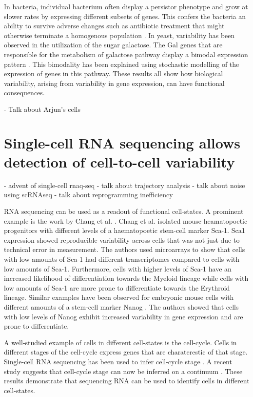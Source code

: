 In bacteria, individual bacterium often display a persistor phenotype and grow at slower rates by expressing different subsets of genes. This confers the bacteria an ability to survive adverse changes such as antibiotic treatment that might otherwise terminate a homogenous population \cite{veening_bet-hedging_2008}. In yeast, variability has been observed in the utilization of the sugar galactose. The Gal genes that are responsible for the metabolism of galactose pathway display a bimodal expression pattern \cite{acar_enhancement_2005}. This bimodality has been explained using stochastic modelling of the expression of genes in this pathway. These results all show how biological variability, arising from variability in gene expression, can have functional consequences. 


- Talk about Arjun's cells


\section{Single-cell RNA sequencing allows detection of cell-to-cell variability}

- advent of single-cell rnaq-seq
- talk about trajectory analysis
- talk about noise using scRNAseq
- talk about reprogramming inefficiency

RNA sequencing can be used as a readout of functional cell-states. A prominent example is the work by Chang et al.  \cite{chang_transcriptome-wide_2008}. Chang et al. isolated mouse heamatopoetic progenitors with different levels of a haematopoetic stem-cell marker Sca-1.  Sca1 expression showed reproducible variability across cells that was not just due to technical error in measurement. The authors used microarrays to show that cells with low amounts of Sca-1 had different transcriptomes compared to cells with low amounts of Sca-1. Furthermore, cells with higher levels of Sca-1 have an increased likelihood of differentiation towards the Myeloid lineage while cells with low amounts of Sca-1 are more prone to differentiate towards the Erythroid lineage. Similar examples have been observed for embryonic mouse cells with different amounts of a stem-cell marker Nanog \cite{kalmar_regulated_2009}. The authors showed that cells with low levels of Nanog exhibit increased variability in gene expression and are prone to differentiate.

A well-studied example of cells in different cell-states is the cell-cycle. Cells in different stages of the cell-cycle express genes that are charaterestic of that stage. Single-cell RNA sequencing has been used to infer cell-cycle stage \cite{buettner_computational_2015,leng_oscope_2015}. A recent study suggests that cell-cycle stage can now be inferred on a continuum  \cite{hsiao_characterizing_2019}. These results demonstrate that sequencing RNA can be used to identify cells in different cell-states.  \cite{trapnell_defining_2015,shaffer_memory_2018,sharma_chromatin-mediated_2010}


